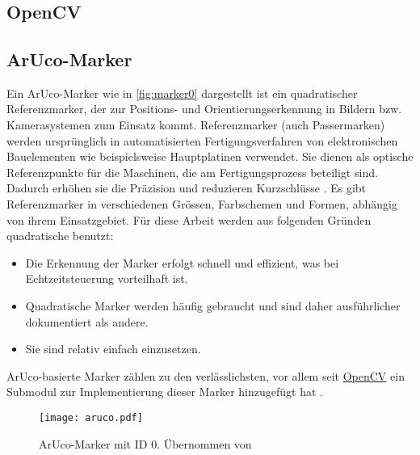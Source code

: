 \chapter{\chapTwo}
\label{sec:kapitel2} %

\begingroup
\fontsize{12pt}{14pt}\selectfont

\section{OpenCV}
\label{sec:opencv} %
\blindtext

\section{ArUco-Marker}
Ein ArUco-Marker wie in \autoref{fig:marker0} dargestellt ist ein quadratischer Referenzmarker, der zur Positions- und Orientierungserkennung in Bildern bzw. Kamerasystemen zum Einsatz kommt. Referenzmarker (auch Passermarken) werden ursprünglich in automatisierten Fertigungsverfahren von elektronischen Bauelementen wie beispielsweise Hauptplatinen verwendet. Sie dienen als optische Referenzpunkte für die Maschinen, die am Fertigungsprozess beteiligt sind. Dadurch erhöhen sie die Präzision und reduzieren Kurzschlüsse \cite{Wiki:Passermarke}.
Es gibt Referenzmarker in verschiedenen Grössen, Farbschemen und Formen, abhängig von ihrem Einsatzgebiet. Für diese Arbeit werden aus folgenden Gründen quadratische benutzt:

\begin{itemize}
    \item Die Erkennung der Marker erfolgt schnell und effizient, was bei Echtzeitsteuerung vorteilhaft ist.
    \item Quadratische Marker werden häufig gebraucht und sind daher ausführlicher dokumentiert als andere.
    \item Sie sind relativ einfach einzusetzen.
\end{itemize}

ArUco-basierte Marker zählen zu den verlässlichsten, vor allem seit \hyperref[sec:opencv]{OpenCV} ein Submodul zur Implementierung dieser Marker hinzugefügt hat \cite{IJ:fiducial}.

\begin{figure}[H]
    \centering
        \texttt{[image: aruco.pdf]}
    \caption{ArUco-Marker mit ID 0. Übernommen von \cite{chev:arucogen}}
        \label{fig:marker0}
\end{figure}

